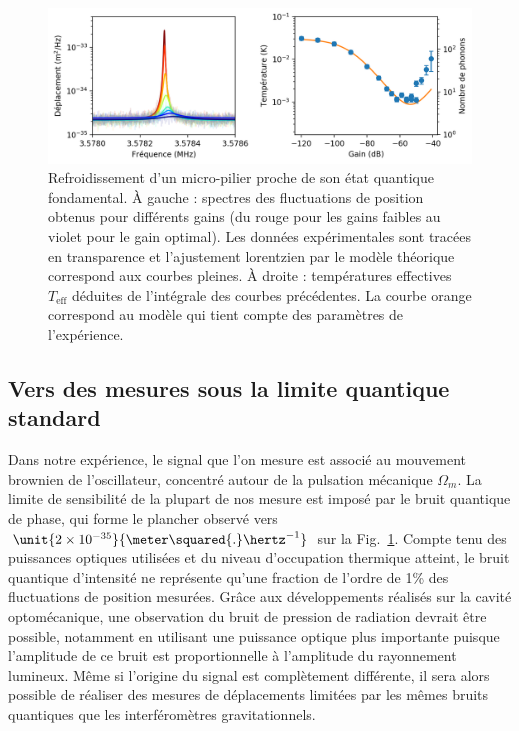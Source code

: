 \documentclass[12pt,a4paper]{article}
\begin{document}
\begin{figure}
\center
\includegraphics[scale=0.75]{figures/feedback_cooling_6phonons.png}
\caption{Refroidissement d'un micro-pilier proche de son état quantique fondamental.
À gauche : spectres des fluctuations de position obtenus pour différents gains (du rouge pour les gains faibles au violet pour le gain optimal).
Les données expérimentales sont tracées en transparence et l'ajustement lorentzien par le modèle théorique correspond aux courbes pleines.
À droite : températures effectives $T_\mathrm{eff}$ déduites de l'intégrale des courbes précédentes.
La courbe orange correspond au modèle qui tient compte des paramètres de l'expérience.}
\label{fig:feedback_cooling_pillar}
\end{figure}

\subsection{Vers des mesures sous la limite quantique standard}
\label{sec:prospects}

Dans notre expérience, le signal que l'on mesure est associé au mouvement brownien de l'oscillateur, concentré autour de la pulsation mécanique $\Omega_m$.
La limite de sensibilité de la plupart de nos mesure est imposé par le bruit quantique de phase, qui forme le plancher observé vers $\unit{2\times10^{-35}}{\meter\squared{.}\hertz^{-1}}$ sur la Fig.~\ref{fig:feedback_cooling_pillar}.
Compte tenu des puissances optiques utilisées et du niveau d'occupation thermique atteint, le bruit quantique d'intensité ne représente qu'une fraction de l'ordre de \unit{1}{\%} des fluctuations de position mesurées.
Grâce aux développements réalisés sur la cavité optomécanique, une observation du bruit de pression de radiation devrait être possible, notamment en utilisant une puissance optique plus importante puisque l'amplitude de ce bruit est proportionnelle à l'amplitude du rayonnement lumineux.
Même si l'origine du signal est complètement différente, il sera alors possible de réaliser des mesures de déplacements limitées par les mêmes bruits quantiques que les interféromètres gravitationnels.
\end{document}
